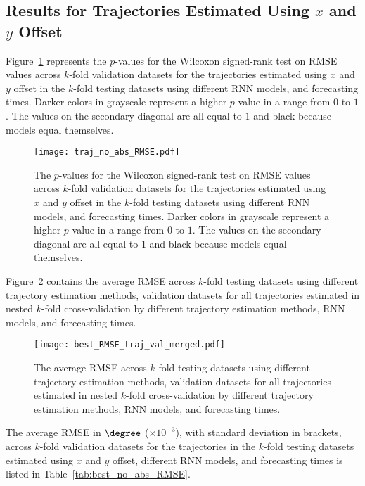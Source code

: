 \subsection{Results for Trajectories Estimated Using $x$ and $y$ Offset}

Figure~\ref{fig:traj_no_abs_RMSE} represents the $p$-values for the Wilcoxon signed-rank test on RMSE values across $k$-fold validation datasets for the trajectories estimated using $x$ and $y$ offset in the $k$-fold testing datasets using different RNN models, and forecasting times. Darker colors in grayscale represent a higher $p$-value in a range from $0$ to $1$. The values on the secondary diagonal are all equal to $1$ and black because models equal themselves.

\begin{figure}[!ht]
	\centering
	\texttt{[image: traj\_no\_abs\_RMSE.pdf]}
	\caption{The $p$-values for the Wilcoxon signed-rank test on RMSE values across $k$-fold validation datasets for the trajectories estimated using $x$ and $y$ offset in the $k$-fold testing datasets using different RNN models, and forecasting times. Darker colors in grayscale represent a higher $p$-value in a range from $0$ to $1$. The values on the secondary diagonal are all equal to $1$ and black because models equal themselves.}
	\label{fig:traj_no_abs_RMSE}
\end{figure}

Figure~\ref{fig:best_RMSE_traj_val_merged} contains the average RMSE across $k$-fold testing datasets using different trajectory estimation methods, validation datasets for all trajectories estimated in nested $k$-fold cross-validation by different trajectory estimation methods, RNN models, and forecasting times.

\begin{figure}[!ht]
	\centering
	\texttt{[image: best\_RMSE\_traj\_val\_merged.pdf]}
	\caption{The average RMSE across $k$-fold testing datasets using different trajectory estimation methods, validation datasets for all trajectories estimated in nested $k$-fold cross-validation by different trajectory estimation methods, RNN models, and forecasting times.}
	\label{fig:best_RMSE_traj_val_merged}
\end{figure}

The average RMSE in $\degree$ ($\times 10^{-3}$), with standard deviation in brackets, across $k$-fold validation datasets for the trajectories in the $k$-fold testing datasets estimated using $x$ and $y$ offset, different RNN models, and forecasting times is listed in Table~\ref{tab:best_no_abs_RMSE}.


